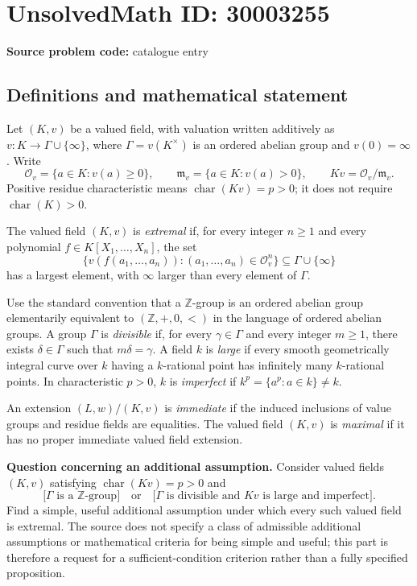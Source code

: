 \documentclass[11pt]{article}
\begin{document}
\section*{UnsolvedMath ID: 30003255}
\textbf{Source problem code:} catalogue entry
\subsection{Definitions and mathematical statement}
Let \((K,v)\) be a valued field, with valuation written additively as \(v:K\to\Gamma\cup\{\infty\}\), where \(\Gamma=v(K^\times)\) is an ordered abelian group and \(v(0)=\infty\). Write
\[
\mathcal O_v=\{a\in K:v(a)\geq 0\},\qquad
\mathfrak m_v=\{a\in K:v(a)>0\},\qquad
Kv=\mathcal O_v/\mathfrak m_v.
\]
Positive residue characteristic means \(\operatorname{char}(Kv)=p>0\); it does not require \(\operatorname{char}(K)>0\).

The valued field \((K,v)\) is \emph{extremal} if, for every integer \(n\geq 1\) and every polynomial \(f\in K[X_1,\ldots,X_n]\), the set
\[
\{v(f(a_1,\ldots,a_n)):(a_1,\ldots,a_n)\in\mathcal O_v^n\}
\subseteq\Gamma\cup\{\infty\}
\]
has a largest element, with \(\infty\) larger than every element of \(\Gamma\).

Use the standard convention that a \(\mathbb Z\)-group is an ordered abelian group elementarily equivalent to \((\mathbb Z,+,0,<)\) in the language of ordered abelian groups. A group \(\Gamma\) is \emph{divisible} if, for every \(\gamma\in\Gamma\) and every integer \(m\geq 1\), there exists \(\delta\in\Gamma\) such that \(m\delta=\gamma\). A field \(k\) is \emph{large} if every smooth geometrically integral curve over \(k\) having a \(k\)-rational point has infinitely many \(k\)-rational points. In characteristic \(p>0\), \(k\) is \emph{imperfect} if \(k^p=\{a^p:a\in k\}\ne k\).

An extension \((L,w)/(K,v)\) is \emph{immediate} if the induced inclusions of value groups and residue fields are equalities. The valued field \((K,v)\) is \emph{maximal} if it has no proper immediate valued field extension.

\textbf{Question concerning an additional assumption.} Consider valued fields \((K,v)\) satisfying \(\operatorname{char}(Kv)=p>0\) and
\[
\bigl[\Gamma\text{ is a }\mathbb Z\text{-group}\bigr]
\quad\text{or}\quad
\bigl[\Gamma\text{ is divisible and }Kv\text{ is large and imperfect}\bigr].
\]
Find a simple, useful additional assumption under which every such valued field is extremal. The source does not specify a class of admissible additional assumptions or mathematical criteria for being simple and useful; this part is therefore a request for a sufficient-condition criterion rather than a fully specified proposition.
\end{document}
